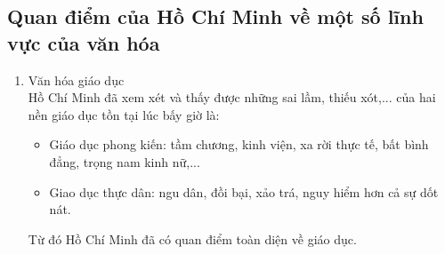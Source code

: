 \documentclass{article}
\begin{document}
	\subsection{Quan điểm của Hồ Chí Minh về một số lĩnh vực của văn hóa}
	\begin{enumerate}
		\item {Văn hóa giáo dục}\\
		Hồ Chí Minh đã xem xét và thấy được những sai lầm, thiếu xót,... của hai nền giáo dục tồn tại lúc bấy giờ là:
		\begin{itemize}
			\item Giáo dục phong kiến: tầm chương, kinh viện, xa rời thực tế, bất bình đẳng, trọng nam kinh nữ,...
			\item Giao dục thực dân: ngu dân, đồi bại, xảo trá, nguy hiểm hơn cả sự dốt nát.
		\end{itemize}
		Từ đó Hồ Chí Minh đã có quan điểm toàn diện về giáo dục.\\


\end{enumerate}
\end{document}
